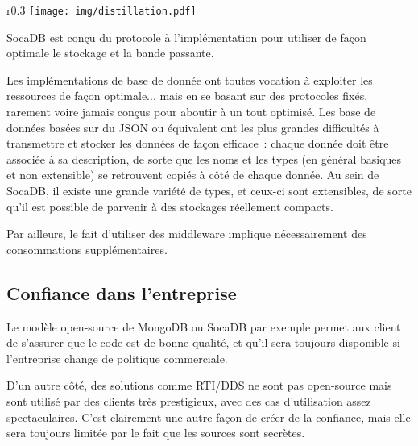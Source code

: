 \documentclass[a4paper,10pt]{scrreprt}
\begin{document}
            \begin{wrapfigure}{r}{0.3\textwidth}
                \hfill
                \vspace{-0.9em}
                \texttt{[image: img/distillation.pdf]}
                \begin{center}
                \begin{scriptsize}
                    SocaDB est conçu du protocole à l'implémentation pour utiliser de façon optimale le stockage et la bande passante.
                \end{scriptsize}
                \end{center}
            \end{wrapfigure}

            Les implémentations de base de donnée ont toutes vocation à exploiter les ressources de façon optimale... mais en se basant sur des protocoles fixés, rarement voire jamais conçus pour aboutir à un tout optimisé. Les base de données basées sur du JSON ou équivalent ont les plus grandes difficultés à transmettre et stocker les données de façon efficace~: chaque donnée doit être associée à sa description, de sorte que les noms et les types (en général basiques et non extensible) se retrouvent copiés à côté de chaque donnée. Au sein de SocaDB, il existe une grande variété de types, et ceux-ci sont extensibles, de sorte qu'il est possible de parvenir à des stockages réellement compacts.
            
            
            Par ailleurs, le fait d'utiliser des middleware implique nécessairement des consommations supplémentaires.
            
        
        \subsection{Confiance dans l'entreprise}
        
            Le modèle open-source de MongoDB ou SocaDB par exemple permet aux client de s'assurer que le code est de bonne qualité, et qu'il sera toujours disponible si l'entreprise change de politique commerciale. 
            
            D'un autre côté, des solutions comme RTI/DDS ne sont pas open-source mais sont utilisé par des clients très prestigieux, avec des cas d'utilisation assez spectaculaires. C'est clairement une autre façon de créer de la confiance, mais elle sera toujours limitée par le fait que les sources sont secrètes.
            
\end{document}

